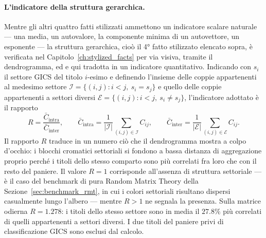 \paragraph{L'indicatore della struttura gerarchica.} Mentre gli altri quattro fatti stilizzati ammettono un indicatore scalare naturale --- una media, un autovalore, la componente minima di un autovettore, un esponente --- la struttura gerarchica, cioò il 4° fatto stilizzato elencato sopra, è verificata nel Capitolo~\ref{ch:stylized_facts} per via visiva, tramite il dendrogramma, ed e qui tradotta in un indicatore quantitativo. Indicando con $s_i$ il settore GICS del titolo $i$-esimo e definendo l'insieme delle coppie appartenenti al medesimo settore $\mathcal{I} = \{(i,j) : i < j,\ s_i = s_j\}$ e quello delle coppie appartenenti a settori diversi $\mathcal{E} = \{(i,j) : i < j,\ s_i \neq s_j\}$, l'indicatore adottato è il rapporto
\begin{equation}
R = \frac{\bar{C}_{\text{intra}}}{\bar{C}_{\text{inter}}}, \qquad
\bar{C}_{\text{intra}} = \frac{1}{|\mathcal{I}|} \sum_{(i,j) \in \mathcal{I}} C_{ij}, \qquad
\bar{C}_{\text{inter}} = \frac{1}{|\mathcal{E}|} \sum_{(i,j) \in \mathcal{E}} C_{ij}.
\label{eq:intra_inter}
\end{equation}
Il rapporto $R$ traduce in un numero ciò che il dendrogramma mostra a colpo d'occhio: i blocchi cromatici settoriali si fondono a bassa distanza di aggregazione proprio perché i titoli dello stesso comparto sono più correlati fra loro che con il resto del paniere. Il valore $R = 1$ corrisponde all'assenza di struttura settoriale --- è il caso del benchmark di pura Random Matrix Theory della Sezione~\ref{sec:benchmark_rmt}, in cui i colori settoriali risultano dispersi casualmente lungo l'albero --- mentre $R > 1$ ne segnala la presenza. Sulla matrice odierna $R = 1.278$: i titoli dello stesso settore sono in media il $27.8\%$ più correlati di quelli appartenenti a settori diversi. I due titoli del paniere privi di classificazione GICS sono esclusi dal calcolo.


